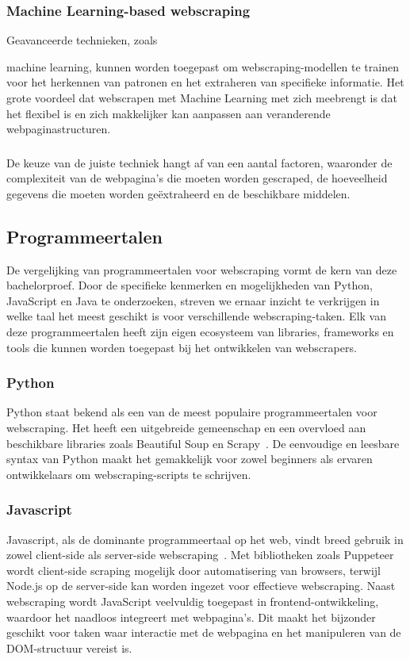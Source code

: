 \subsubsection{Machine Learning-based webscraping}
Geavanceerde technieken, zoals 

machine learning, kunnen worden toegepast om webscraping-modellen te trainen voor het herkennen 
van patronen en het extraheren van specifieke informatie. Het grote voordeel dat webscrapen met Machine Learning met zich meebrengt
is dat het flexibel is en zich makkelijker kan aanpassen aan veranderende webpaginastructuren.

\subsubsection*{}
De keuze van de juiste techniek hangt af van een aantal factoren, waaronder de complexiteit van de webpagina's 
die moeten worden gescraped, de hoeveelheid gegevens die moeten worden geëxtraheerd en de beschikbare middelen.

\subsection{Programmeertalen}
De vergelijking van programmeertalen voor webscraping vormt de kern van deze bachelorproef. 
Door de specifieke kenmerken en mogelijkheden van Python, JavaScript en Java te onderzoeken, 
streven we ernaar inzicht te verkrijgen in welke taal het meest geschikt is voor verschillende webscraping-taken. 
Elk van deze programmeertalen heeft zijn eigen ecosysteem van libraries, frameworks en tools die kunnen worden toegepast 
bij het ontwikkelen van webscrapers.

\subsubsection{Python}
Python staat bekend als een van de meest populaire programmeertalen voor webscraping. Het heeft een uitgebreide gemeenschap en
een overvloed aan beschikbare libraries zoals Beautiful Soup en Scrapy~\autocite{Saabith2019}. De eenvoudige en leesbare syntax van Python maakt het 
gemakkelijk voor zowel beginners als ervaren ontwikkelaars om webscraping-scripts te schrijven.

\subsubsection{Javascript}
Javascript, als de dominante programmeertaal op het web, vindt breed gebruik in zowel client-side als server-side webscraping~\autocite{Raval2023}.
Met bibliotheken zoals Puppeteer wordt client-side scraping mogelijk door automatisering van browsers, terwijl Node.js 
op de server-side kan worden ingezet voor effectieve webscraping. Naast webscraping wordt JavaScript veelvuldig toegepast in 
frontend-ontwikkeling, waardoor het naadloos integreert met webpagina's. Dit maakt het bijzonder geschikt voor taken waar interactie
met de webpagina en het manipuleren van de DOM-structuur vereist is.

